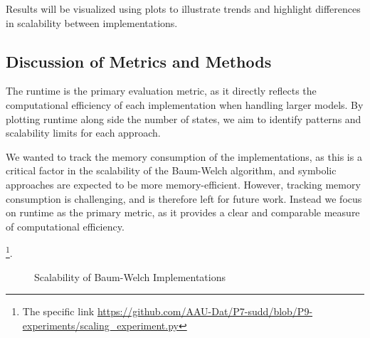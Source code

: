 Results will be visualized using plots to illustrate trends and highlight differences in scalability between implementations.

\subsection{Discussion of Metrics and Methods}
The runtime is the primary evaluation metric, as it directly reflects the computational efficiency of each implementation when handling larger models. 
By plotting runtime along side the number of states, we aim to identify patterns and scalability limits for each approach.

We wanted to track the memory consumption of the implementations, as this is a critical factor in the scalability of the Baum-Welch algorithm, and symbolic approaches are expected to be more memory-efficient.
However, tracking memory consumption is challenging, and is therefore left for future work.
Instead we focus on runtime as the primary metric, as it provides a clear and comparable measure of computational efficiency.

\footnote{The specific link \url{https://github.com/AAU-Dat/P7-sudd/blob/P9-experiments/scaling_experiment.py}}. 


\begin{figure}[htb!]
    \centering
    
    \caption{Scalability of Baum-Welch Implementations}
    \label{fig:scalability}
\end{figure}